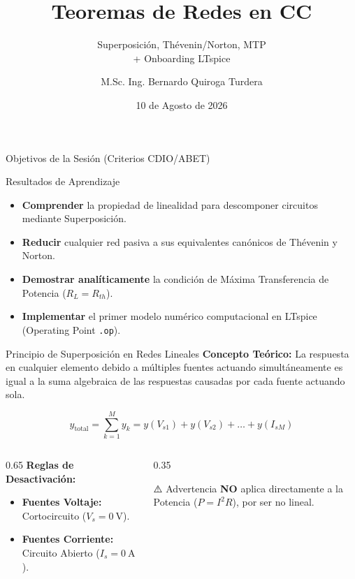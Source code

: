 \documentclass[aspectratio=169, 10pt]{beamer}
\title[Teoremas de Redes en CC]{Teoremas de Redes en CC}
\subtitle{Superposición, Thévenin/Norton, MTP \\+ Onboarding LTspice}
\author[M.Sc. Ing. B. Quiroga]{M.Sc. Ing. Bernardo Quiroga Turdera}
\institute[UCB Tarija]{IMT-121 Circuitos Electrónicos I | UCB Sede Tarija}
\date{10 de Agosto de 2026}
\begin{document}
\begin{frame}
    \titlepage
\end{frame}

\begin{frame}{Objetivos de la Sesión (Criterios CDIO/ABET)}
    \begin{block}{Resultados de Aprendizaje}
        \begin{itemize}
            \item \textbf{Comprender} la propiedad de linealidad para descomponer circuitos mediante Superposición.
            \item \textbf{Reducir} cualquier red pasiva a sus equivalentes canónicos de Thévenin y Norton.
            \item \textbf{Demostrar analíticamente} la condición de Máxima Transferencia de Potencia ($R_L = R_{th}$).
            \item \textbf{Implementar} el primer modelo numérico computacional en LTspice (Operating Point \texttt{.op}).
        \end{itemize}
    \end{block}
\end{frame}

\begin{frame}{Principio de Superposición en Redes Lineales}
    \textbf{Concepto Teórico:} La respuesta en cualquier elemento debido a múltiples fuentes actuando simultáneamente es igual a la suma algebraica de las respuestas causadas por cada fuente actuando sola.
    
    \vspace{0.1cm}
    \begin{equation*}
        y_{\text{total}} = \sum_{k=1}^{M} y_k = y(V_{s1}) + y(V_{s2}) + \dots + y(I_{sM})
    \end{equation*}
    
    \begin{columns}
        \begin{column}{0.65\textwidth}
            \textbf{Reglas de Desactivación:}
            \begin{itemize}
                \item \textbf{Fuentes Voltaje:} Cortocircuito ($V_s = \qty{0}{\volt}$).
                \item \textbf{Fuentes Corriente:} Circuito Abierto ($I_s = \qty{0}{\ampere}$).
            \end{itemize}
        \end{column}
        \begin{column}{0.35\textwidth}
            \begin{alertblock}{⚠️ Advertencia}
                \textbf{NO} aplica directamente a la Potencia ($P = I^2 R$), por ser no lineal.
            \end{alertblock}
        \end{column}
    \end{columns}
\end{frame}
\end{document}
